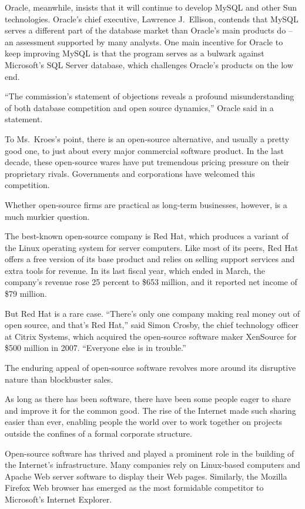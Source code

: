 ﻿\documentclass[12pt]{article}
\begin{document}
Oracle, meanwhile, insists that it will continue to develop MySQL and other Sun technologies.
Oracle's chief executive, Lawrence J.~Ellison, contends that MySQL serves a different part of the
database market than Oracle's main products do -- an assessment supported by many analysts. One main
incentive for Oracle to keep improving MySQL is that the program serves as a bulwark against
Microsoft's SQL Server database, which challenges Oracle's products on the low end.

``The commission's statement of objections reveals a profound misunderstanding of both database
competition and open source dynamics,'' Oracle said in a statement.

To Ms.~Kroes's point, there is an open-source alternative, and usually a pretty good one, to just
about every major commercial software product. In the last decade, these open-source wares have put
tremendous pricing pressure on their proprietary rivals. Governments and corporations have welcomed
this competition.

Whether open-source firms are practical as long-term businesses, however, is a much murkier
question.

The best-known open-source company is Red Hat, which produces a variant of the Linux operating
system for server computers. Like most of its peers, Red Hat offers a free version of its base
product and relies on selling support services and extra tools for revenue. In its last fiscal year,
which ended in March, the company's revenue rose 25 percent to \$653 million, and it reported net
income of \$79 million.

But Red Hat is a rare case. ``There's only one company making real money out of open source, and
that's Red Hat,'' said Simon Crosby, the chief technology officer at Citrix Systems, which acquired
the open-source software maker XenSource for \$500 million in 2007. ``Everyone else is in trouble.''

The enduring appeal of open-source software revolves more around its disruptive nature than
blockbuster sales.

As long as there has been software, there have been some people eager to share and improve it for
the common good. The rise of the Internet made such sharing easier than ever, enabling people the
world over to work together on projects outside the confines of a formal corporate structure.

Open-source software has thrived and played a prominent role in the building of the Internet's
infrastructure. Many companies rely on Linux-based computers and Apache Web server software to
display their Web pages. Similarly, the Mozilla Firefox Web browser has emerged as the most
formidable competitor to Microsoft's Internet Explorer.
\end{document}
